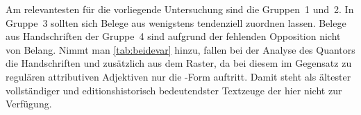 Am relevantesten für die vorliegende Untersuchung sind die Gruppen~1 und~2. In
Gruppe~3 sollten sich Belege aus \citet{kc:VB} wenigstens tendenziell zuordnen
lassen. Belege aus Handschriften der Gruppe~4 sind aufgrund der fehlenden
Opposition nicht von Belang. Nimmt man \cref{tab:beidevar} hinzu, fallen bei
der Analyse des Quantors die Handschriften \cite{kc:A1} und \cite{kc:M}
zusätzlich aus dem Raster, da bei diesem im Gegensatz zu regulären attributiven
Adjektiven nur die -Form auftritt. Damit steht \citet{kc:A1} als
ältester vollständiger und editionshistorisch bedeutendster Textzeuge der
\KC{} hier nicht zur Verfügung.
